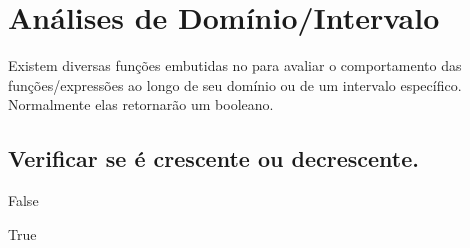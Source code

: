 \documentclass[letterpaper,10pt,english]{jupyterBook}
\begin{document}
\section{Análises de Domínio/Intervalo}
\label{\detokenize{chapters/4:analises-de-dominio-intervalo}}
\sphinxAtStartPar
Existem diversas funções embutidas no  para avaliar o comportamento das funções/expressões ao longo de seu domínio ou de um intervalo específico. Normalmente elas retornarão um booleano.


\subsection{Verificar se é crescente ou decrescente.}
\label{\detokenize{chapters/4:verificar-se-e-crescente-ou-decrescente}}
\begin{sphinxVerbatim}[commandchars=\\\{\}]
\end{sphinxVerbatim}

\begin{sphinxVerbatim}[commandchars=\\\{\}]
False
\end{sphinxVerbatim}

\begin{sphinxVerbatim}[commandchars=\\\{\}]
  
\end{sphinxVerbatim}

\begin{sphinxVerbatim}[commandchars=\\\{\}]
True
\end{sphinxVerbatim}

\begin{sphinxVerbatim}[commandchars=\\\{\}]
  
\end{sphinxVerbatim}
\end{document}
